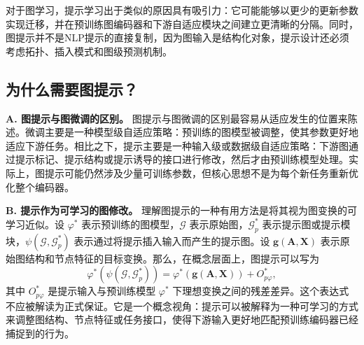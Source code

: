 对于图学习，提示学习出于类似的原因具有吸引力：它可能能够以更少的更新参数实现迁移，并在预训练图编码器和下游自适应模块之间建立更清晰的分隔。同时，图提示并不是NLP提示的直接复制，因为图输入是结构化对象，提示设计还必须考虑拓扑、插入模式和图级预测机制。


\subsection{为什么需要图提示？}\label{sec:why_prompt}



\textbf{A. 图提示与图微调的区别。}
图提示与图微调的区别最容易从适应发生的位置来陈述。微调主要是一种模型级自适应策略：预训练的图模型被调整，使其参数更好地适应下游任务。相比之下，提示主要是一种输入级或数据级自适应策略：下游图通过提示标记、提示结构或提示诱导的接口进行修改，然后才由预训练模型处理。实际上，图提示可能仍然涉及少量可训练参数，但核心思想不是为每个新任务重新优化整个编码器。


\textbf{B. 提示作为可学习的图修改。}
理解图提示的一种有用方法是将其视为图变换的可学习近似。设 $\varphi^*$ 表示预训练的图模型，$\mathcal{G}$ 表示原始图，$\mathcal{G}_p^*$ 表示提示图或提示模块，$\psi(\mathcal{G}, \mathcal{G}_p^*)$ 表示通过将提示插入输入而产生的提示图。设 $\mathbf{g}(\mathbf{A}, \mathbf{X})$ 表示原始图结构和节点特征的目标变换。那么，在概念层面上，图提示可以写为
\begin{equation}\label{equ:error_bound_new}%
    \varphi^*\left(\psi(\mathcal{G}, \mathcal{G}_p^*)\right)=\varphi^*(\mathbf{g}(\mathbf{A}, \mathbf{X})) + O^{*}_{p\varphi},
\end{equation}
其中 $O^{*}_{p\varphi}$ 是提示输入与预训练模型 $\varphi^*$ 下理想变换之间的残差差异。这个表达式不应被解读为正式保证。它是一个概念视角：提示可以被解释为一种可学习的方式来调整图结构、节点特征或任务接口，使得下游输入更好地匹配预训练编码器已经捕捉到的行为。


